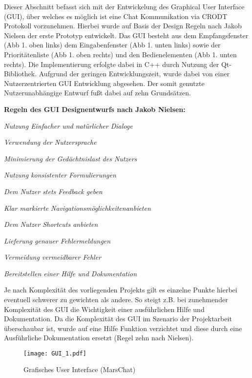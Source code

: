 Dieser Abschnitt befasst sich mit der Entwickelung des Graphical User Interface
(GUI), {\"u}ber welches es m{\"o}glich ist eine Chat Kommunikation via CRODT
Protokoll vorzunehmen. Hierbei wurde auf Basis der Design Regeln nach
Jakob Nielsen der erste Prototyp entwickelt. Das GUI besteht
aus dem Empfangsfenster (Abb 1. oben links) dem Eingabenfenster (Abb 1.
unten links) sowie der Priorit{\"a}tenliste (Abb 1. oben rechts) und den
Bedienelementen (Abb 1. unten rechts). Die Implementierung erfolgte dabei in
C++ durch Nutzung der Qt-Bibliothek. Aufgrund der geringen Entwicklungszeit,
wurde dabei von einer Nutzerzentrierten GUI Entwicklung
abgesehen. Der somit genutzte Nutzerunabh{\"a}ngige Entwurf fu{\ss}t dabei auf
zehn Grunds{\"a}tzen.

\textbf{Regeln des GUI Designentwurfs nach Jakob Nielsen:}

   \begin{compactenum}[I]
     \item \textit{Nutzung Einfacher und nat{\"u}rlicher Dialoge}
     \item \textit{Verwendung der Nutzersprache}
     \item \textit{Minimierung der Ged{\"a}chtnislast des Nutzers}
     \item \textit{Nutzung konsistenter Formulierungen}
     \item \textit{Dem Nutzer stets Feedback geben}
     \item \textit{Klar markierte Navigationsm{\"o}glichkeitenanbieten}
     \item \textit{Dem Nutzer Shortcuts anbieten}
     \item \textit{Lieferung genauer Fehlermeldungen}
     \item \textit{Vermeidung vermeidbarer Fehler}
     \item \textit{Bereitstellen einer Hilfe und Dokumentation}
   \end{compactenum}
   \label{Nielsen}
   

Je nach Komplexit{\"a}t des vorliegenden Projekts gilt es einzelne Punkte
hierbei eventuell schwerer zu gewichten als andere. So steigt z.B. bei
zunehmender Komplexit{\"a}t des GUI die Wichtigkeit einer ausf{\"u}hrlichen
Hilfe und Dokumentation. Da die Komplexit{\"a}t des GUI im Szenario der
Projektarbeit {\"u}berschaubar ist, wurde auf eine Hilfe Funktion verzichtet und
diese durch eine Ausf{\"u}hrliche Dokumentation ersetzt (Regel zehn nach
Nielsen).

\begin{figure}[H]
\centering
\texttt{[image: GUI\_1.pdf]}
\caption{Grafisches User Interface (MarsChat)}
\label{fig:GUI}
\end{figure}

